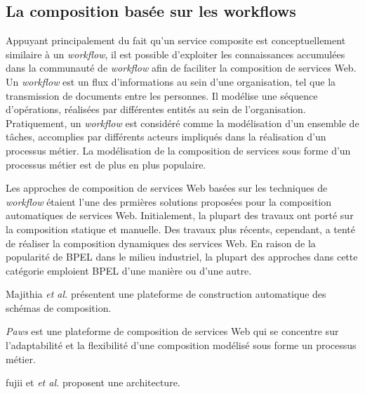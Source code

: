   \subsection{La composition  basée sur les workflows}
    \label{sec:les-approches-basees}


    Appuyant principalement du fait qu'un service composite est
    conceptuellement similaire à un \textit{workflow}, il est possible
    d'exploiter les connaissances accumulées dans la communauté de
    \textit{workflow} afin de faciliter la composition de services
    Web. Un \textit{workflow} est un flux d'informations au sein d'une
    organisation, tel que la transmission de documents entre les
    personnes. Il modélise une séquence d'opérations, réalisées par
    différentes entités au sein de l'organisation. Pratiquement, un
    \textit{workflow} est considéré comme la modélisation d'un
    ensemble de tâches, accomplies par différents acteurs impliqués
    dans la réalisation d'un processus métier. La modélisation de la
    composition de services sous forme d'un processus métier est de
    plus en plus populaire.

    Les approches de composition de services Web basées sur les
    techniques de \textit{workflow} étaient l'une des prmières
    solutions proposées pour la composition automatiques de services
    Web. Initialement, la plupart des travaux ont porté sur la
    composition statique et manuelle. Des travaux plus récents,
    cependant, a tenté de réaliser la composition dynamiques des
    services Web. En raison de la popularité de \textsc{BPEL} dans le
    milieu industriel, la plupart des approches dans cette catégorie
    emploient \textsc{BPEL} d'une manière ou d'une autre.

    Majithia \textit{et al.} \cite{majithia2004framework} présentent
    une plateforme de construction automatique des schémas de
    composition.

    \textit{Paws} \cite{ardagna2007paws} est une plateforme de
    composition de services Web qui se concentre sur l'adaptabilité et
    la flexibilité d'une composition modélisé sous forme un processus
    métier.

    fujii et \textit{et al.} \cite{fujii2006semantics}
    \cite{fujii2009semantics} proposent une architecture.

